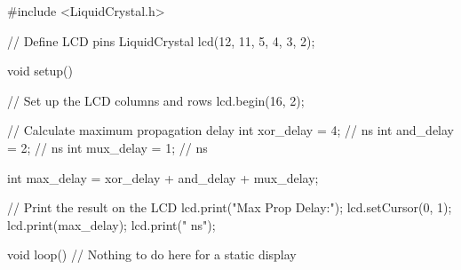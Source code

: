 #include <LiquidCrystal.h>

// Define LCD pins
LiquidCrystal lcd(12, 11, 5, 4, 3, 2);

void setup() {
  // Set up the LCD columns and rows
  lcd.begin(16, 2);

  // Calculate maximum propagation delay
  int xor_delay = 4; // ns
  int and_delay = 2; // ns
  int mux_delay = 1; // ns

  int max_delay = xor_delay + and_delay + mux_delay;

  // Print the result on the LCD
  lcd.print("Max Prop Delay:");
  lcd.setCursor(0, 1);
  lcd.print(max_delay);
  lcd.print(" ns");
}

void loop() {
  // Nothing to do here for a static display
}
